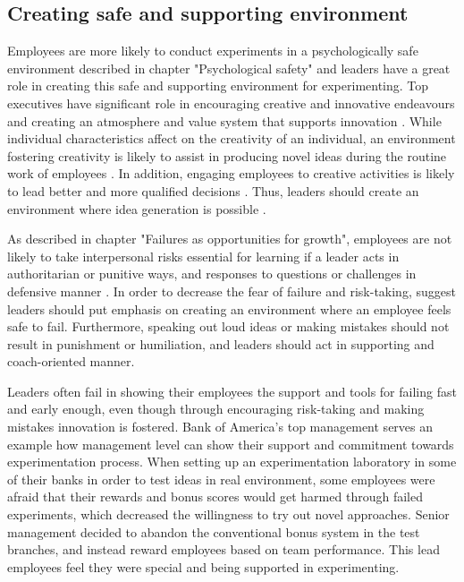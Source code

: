 \subsection{Creating safe and supporting environment}
Employees are more likely to conduct experiments in a psychologically safe environment described in chapter "Psychological safety" and leaders have a great role in creating this safe and supporting environment for experimenting. Top executives have significant role in encouraging creative and innovative endeavours and creating an atmosphere and value system that supports innovation \citep{quinn1985managing}. While individual characteristics affect on the creativity of an individual, an environment fostering creativity is likely to assist in producing novel ideas during the routine work of employees \citep{amabile1996assessing}. In addition, engaging employees to creative activities is likely to lead better and more qualified decisions \citep{shalley2004leaders}. Thus, leaders should create an environment where idea generation is possible \citep{andrews1970social}.

As described in chapter "Failures as opportunities for growth", employees are not likely to take interpersonal risks essential for learning if a leader acts in authoritarian or punitive ways, and responses to questions or challenges in defensive manner \citep{edmondson1999psychological}. In order to decrease the fear of failure and risk-taking, \citet{amabile2008creativity} suggest leaders should put emphasis on creating an environment where an employee feels safe to fail. Furthermore, speaking out loud ideas or making mistakes should not result in punishment or humiliation, and leaders should act in supporting and coach-oriented manner\citep{edmondson1999psychological}.

Leaders often fail in showing their employees the support and tools for failing fast and early enough, even though through encouraging risk-taking and making mistakes innovation is fostered.\citep{farson2002failuretolerantleader} Bank of America's top management serves an example how management level can show their support and commitment towards experimentation process. When setting up an experimentation laboratory in some of their banks in order to test ideas in real environment, some employees were afraid that their rewards and bonus scores would get harmed through failed experiments, which decreased the willingness to try out novel approaches. Senior management decided to abandon the conventional bonus system in the test branches, and instead reward employees based on team performance. This lead employees feel they were special and being supported in experimenting. \citep{thomke2003r}

